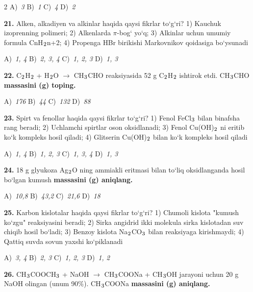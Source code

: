 \documentclass[11pt,a4paper]{article}
\renewcommand{\textsubscript}[1]{\ensuremath{_{\text{\fontsize{8}{8}\selectfont #1}}}}
\begin{document}
\begin{multicols}{2}
\noindent A)~\textsl{3} \hfill B)~\textsl{1} \hfill C)~\textsl{4} \hfill D)~\textsl{2}\par
\vspace{4pt}
\noindent\textbf{21.} Alken, alkadiyen va alkinlar haqida qaysi fikrlar to`g`ri? 1) Kauchuk izoprenning polimeri; 2) Alkenlarda $\pi$-bog` yo`q; 3) Alkinlar uchun umumiy formula CnH\textsubscript{2}n+2; 4) Propenga HBr birikishi Markovnikov qoidasiga bo`ysunadi

\noindent A)~\textsl{1, 4} \hfill B)~\textsl{2, 3, 4} \hfill C)~\textsl{1, 2, 3} \hfill D)~\textsl{1, 3}\par
\vspace{4pt}
\noindent\textbf{22.} C\textsubscript{2}H\textsubscript{2} + H\textsubscript{2}O $\to$ CH\textsubscript{3}CHO reaksiyasida 52 g C\textsubscript{2}H\textsubscript{2} ishtirok etdi. CH\textsubscript{3}CHO \textbf{massasini (g) toping.}

\noindent A)~\textsl{176} \hfill B)~\textsl{44} \hfill C)~\textsl{132} \hfill D)~\textsl{88}\par
\vspace{4pt}
\noindent\textbf{23.} Spirt va fenollar haqida qaysi fikrlar to`g`ri? 1) Fenol FeCl\textsubscript{3} bilan binafsha rang beradi; 2) Uchlamchi spirtlar oson oksidlanadi; 3) Fenol Cu(OH)\textsubscript{2} ni eritib ko`k kompleks hosil qiladi; 4) Glitserin Cu(OH)\textsubscript{2} bilan ko`k kompleks hosil qiladi

\noindent A)~\textsl{1, 4} \hfill B)~\textsl{1, 2, 3} \hfill C)~\textsl{1, 3, 4} \hfill D)~\textsl{1, 3}\par
\vspace{4pt}
\noindent\textbf{24.} 18 g glyukoza Ag\textsubscript{2}O ning ammiakli eritmasi bilan to`liq oksidlanganda hosil bo`lgan kumush \textbf{massasini (g) aniqlang.}

\noindent A)~\textsl{10,8} \hfill B)~\textsl{43,2} \hfill C)~\textsl{21,6} \hfill D)~\textsl{18}\par
\vspace{4pt}
\noindent\textbf{25.} Karbon kislotalar haqida qaysi fikrlar to`g`ri? 1) Chumoli kislota "kumush ko`zgu" reaksiyasini beradi; 2) Sirka angidrid ikki molekula sirka kislotadan suv chiqib hosil bo`ladi; 3) Benzoy kislota Na\textsubscript{2}CO\textsubscript{3} bilan reaksiyaga kirishmaydi; 4) Qattiq suvda sovun yaxshi ko`piklanadi

\noindent A)~\textsl{3, 4} \hfill B)~\textsl{2, 3} \hfill C)~\textsl{1, 2, 3} \hfill D)~\textsl{1, 2}\par
\vspace{4pt}
\noindent\textbf{26.} CH\textsubscript{3}COOCH\textsubscript{3} + NaOH $\to$ CH\textsubscript{3}COONa + CH\textsubscript{3}OH jarayoni uchun 20 g NaOH olingan (unum 90\%). CH\textsubscript{3}COONa \textbf{massasini (g) aniqlang.}


\end{multicols}
\end{document}
